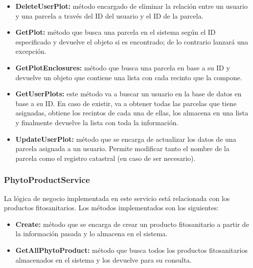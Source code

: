 \begin{itemize}
\begin{enumerate}
        \item Finalmente, se crea la parcela a través de la unión de cada geometría de los recintos (función \textit{union} de \textit{CascadedPolygonUnion}).
    \end{enumerate}

    \item \textbf{DeleteUserPlot:} método encargado de eliminar la relación entre un usuario y una parcela a través del ID del usuario y el ID de la parcela.
    
    \item \textbf{GetPlot:} método que busca una parcela en el sistema según el ID especificado y devuelve el objeto si es encontrado; de lo contrario lanzará una excepción.
    
    \item \textbf{GetPlotEnclosures:} método que busca una parcela en base a su ID y devuelve un objeto que contiene una lista con cada recinto que la compone.
    
    \item \textbf{GetUserPlots:} este método va a buscar un usuario en la base de datos en base a su ID. En caso de existir, va a obtener todas las parcelas que tiene asignadas, 
    obtiene los recintos de cada una de ellas, los almacena en una lista y finalmente devuelve la lista con toda la información.

    \item \textbf{UpdateUserPlot:} método que se encarga de actualizar los datos de una parcela asignada a un usuario. Permite modificar tanto el nombre de la parcela como el  
    registro catastral (en caso de ser necesario).
\end{itemize}

\subsubsection{PhytoProductService}

La lógica de negocio implementada en este servicio está relacionada con los productos fitosanitarios. Los métodos implementados son los siguientes:

\begin{itemize}
    \item \textbf{Create:} método que se encarga de crear un producto fitosanitario a partir de la información pasada y lo almacena en el sistema.
    
    \item \textbf{GetAllPhytoProduct:} método que busca todos los productos fitosanitarios almacenados en el sistema y los devuelve para su consulta.
\end{itemize}

